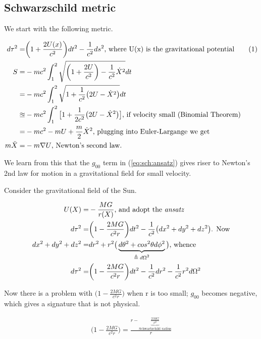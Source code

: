 \documentclass[]{article}
\newcommand\numberthis{\addtocounter{equation}{1}\tag{\theequation}}
\begin{document}
{\subsection{Schwarzschild metric}

We start with the following metric.

\begin{align*}
	d \tau^2 =& \bigg(1+\frac{2 U(x)}{c^2}\bigg) dt^2 - \frac{1}{c^2} ds^2 \text{, where U(x) is the gravitational potential} \numberthis \label{eq:sch:ansatz}\\
	S =& -m c^2 \int_{1}^{2} \sqrt{\bigg(1+\frac{2U}{c^2}\bigg) - \frac{1}{c^2}\dot{X}^2} dt\\
	=& -m c^2 \int_{1}^{2} \sqrt{1 +\frac{1}{c^2}\big(2U-\dot{X}^2\big)} dt\\
	\approxeq& -m c^2 \int_{1}^{2} \big[1 + \frac{1}{2c^2}\big(2U-\dot{X}^2\big)\big] \text{, if velocity small (Binomial Theorem)}\\
	=& -m c^2 -mU + \frac{m}{2} \dot{X}^2 \text{, plugging into Euler-Largange we get}\\
	m\ddot{X} =& -m \nabla U \text{, Newton's second law.}
\end{align*}

We learn from this that the $g_00$ term in (\ref{eq:sch:ansatz}) gives riser to Newton's 2nd law for motion in a gravitational field for small velocity.

Consider the gravitational field of the Sun.

\begin{align*}
	U(X) =& - \frac{MG}{r(X)} \text{, and adopt the \emph{ansatz}}\\
		d \tau^2 =& \bigg(1-\frac{2 MG}{c^2 r}\bigg) dt^2 - \frac{1}{c^2} \big(dx^2 + dy^2 +dz^2\big) \text{. Now}\\
		dx^2 + dy^2 +dz^2 =& dr^2 + r^2 \big(\underbrace{d\theta^2 + cos^2 \theta d\phi^2}_\text{$\triangleq d\Omega^2$}\big) \text{, whence}\\
		d \tau^2 =& \bigg(1-\frac{2 MG}{c^2 r}\bigg) dt^2 - \frac{1}{c^2}dr^2 - \frac{1}{c^2} r^2 d\Omega^2
\end{align*}

Now there is a problem with $\bigg(1-\frac{2 MG}{c^2 r}\bigg)$ when r is too small; $g_00$ becomes negative, which gives a signature that is not physical.

\begin{align*}
	\bigg(1-\frac{2 MG}{c^2 r}\bigg) = \frac{r-\underbrace{\frac{2 MG}{c^2}}_\text{Schwartzchild radius}}{r}
\end{align*}

}
\end{document}
